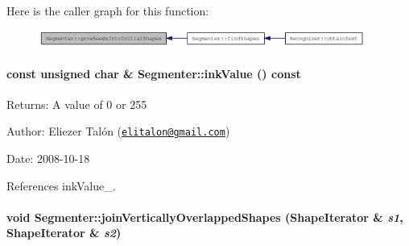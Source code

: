 Here is the caller graph for this function:\nopagebreak
\begin{figure}[H]
\begin{center}
\leavevmode
\includegraphics[width=304pt]{class_segmenter_72c007e345fad7abbf6e9d4edb615a50_icgraph}
\end{center}
\end{figure}
\hypertarget{class_segmenter_e9bc56ddcbe5ea4abb40fcc85e3d9fbe}{
\paragraph[{inkValue}]{\setlength{\rightskip}{0pt plus 5cm}const unsigned char \& Segmenter::inkValue () const}\hfill}
\label{class_segmenter_e9bc56ddcbe5ea4abb40fcc85e3d9fbe}


\begin{Desc}
\item[Returns:]A value of 0 or 255\end{Desc}
\begin{Desc}
\item[Author:]Eliezer Talón (\href{mailto:elitalon@gmail.com}{\tt elitalon@gmail.com}) \end{Desc}
\begin{Desc}
\item[Date:]2008-10-18 \end{Desc}


References inkValue\_\-.\hypertarget{class_segmenter_a6fc98922155143cf36f542118c33f3a}{
\paragraph[{joinVerticallyOverlappedShapes}]{\setlength{\rightskip}{0pt plus 5cm}void Segmenter::joinVerticallyOverlappedShapes ({\bf ShapeIterator} \& {\em s1}, \/  {\bf ShapeIterator} \& {\em s2})}\hfill}
\label{class_segmenter_a6fc98922155143cf36f542118c33f3a}


